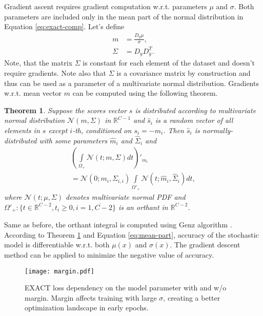 \documentclass[nohyperref]{article}
\theoremstyle{plain}
\newtheorem{theorem}{Theorem}[section]
\theoremstyle{definition}
\theoremstyle{remark}
\begin{document}
Gradient ascent requires gradient computation w.r.t. parameters $\mu$ and $\sigma$. Both parameters are included only in the mean part of the normal distribution in Equation \ref{eq:exact-comp}. Let's define
\begin{align}
    \label{eq:mean-part}
    m &= \frac{D_y\mu}{\sigma}, \\
    \Sigma &= D_yD_y^T.
\end{align}
Note, that the matrix $\Sigma$ is constant for each element of the dataset and doesn't require gradients. Note also that $\Sigma$ is a covariance matrix by construction and thus can be used as a parameter of a multivariate normal distribution. Gradients w.r.t. mean vector $m$ can be computed using the following theorem.
\vskip 0.1in
\begin{theorem}
\label{theor:grad}
Suppose the scores vector $s$ is distributed according to multivariate normal distribution $\mathcal{N}(m, \Sigma)$ in $\mathbb{R}^{C-1}$ and $\hat s_i$ is a random vector of all elements in $s$ except $i$-th, conditioned on $s_i = -m_i$. Then $\hat s_i$ is normally-distributed with some parameters $\hat m_i$ and $\hat \Sigma_i$ and
\begin{multline}
    \left(\int\limits_{\Omega_+}\mathcal{N}(t; m, \Sigma) dt\right)'_{m_i} \\  = \mathcal{N}(0;m_i, \Sigma_{i, i})
    \int\limits_{\Omega'_+}\mathcal{N}(t; \hat m_i, \hat \Sigma_i) dt,
    \label{eq:exact-grad}
\end{multline}
where $\mathcal{N}(t; \mu, \Sigma)$ denotes multivariate normal PDF and $\Omega'_+: \{t \in \mathbb{R}^{C-2}, t_i \ge 0, i = \overline{1,C-2}\}$ is an orthant in $\mathbb{R}^{C-2}$.
\end{theorem}
Same as before, the orthant integral is computed using Genz algorithm \cite{genz1992numerical}.
According to Theorem \ref{theor:grad} and Equation \ref{eq:mean-part}, accuracy of the stochastic model is differentiable w.r.t. both $\mu(x)$ and $\sigma(x)$. The gradient descent method can be applied to minimize the negative value of accuracy.





\begin{figure}[t]
\vskip 0.1in
\centering
\texttt{[image: margin.pdf]}
\caption{EXACT loss dependency on the model parameter with and w/o margin. Margin affects training with large $\sigma$, creating a better optimization landscape in early epochs.}
\label{fig:margin}
\end{figure}
\end{document}
